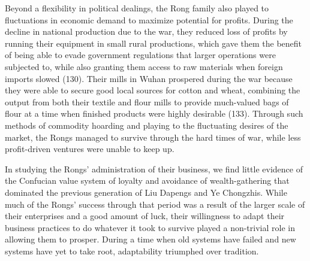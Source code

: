 Beyond a flexibility in political dealings, the Rong family also played to
fluctuations in economic demand to maximize potential for profits. During the
decline in national production due to the war, they reduced  loss of profits by
running their equipment in small rural productions, which gave them the benefit
of being able to evade government regulations that larger operations were
subjected to, while also granting them access to raw materials when foreign
imports slowed (130). Their mills in Wuhan prospered during the war because they
were able to secure good local sources for cotton and wheat, combining the
output from both their textile and flour mills to provide much-valued bags of
flour at a time when finished products were highly desirable (133). Through such
methods of commodity hoarding and playing to the fluctuating desires of the
market, the Rongs managed to survive through the hard times of war, while less
profit-driven ventures were unable to keep up.

In studying the Rongs' administration of their business, we find little evidence
of the Confucian value system of loyalty and avoidance of wealth-gathering that
dominated the previous generation of Liu Dapengs and Ye Chongzhis.  While much
of the Rongs' success through that period was a result of the larger scale of
their enterprises and a good amount of luck, their willingness to adapt their
business practices to do whatever it took to survive played a non-trivial role
in allowing them to prosper.  During a time when old systems have failed and new
systems have yet to take root, adaptability triumphed over tradition.
